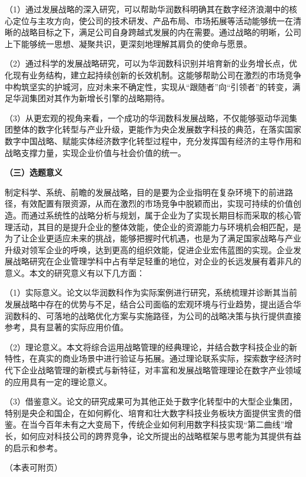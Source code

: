 \documentclass[UTF8, a4paper, 11pt]{ctexart}
\begin{document}
\begin{UnifiedBox}
（1）通过发展战略的深入研究，可以帮助华润数科明确其在数字经济浪潮中的核心定位与主攻方向，使公司的技术研发、产品布局、市场拓展等活动能够统一在清晰的战略目标之下，满足公司自身跨越式发展的内在需要。通过战略的明晰，公司上下能够统一思想、凝聚共识，更深刻地理解其肩负的使命与愿景。

（2）通过科学的发展战略研究，可以为华润数科识别并培育新的业务增长点，优化现有业务结构，建立起持续创新的长效机制。这能够帮助公司在激烈的市场竞争中构筑坚实的护城河，应对未来不确定性，实现从“跟随者”向“引领者”的转变，满足华润集团对其作为新增长引擎的战略期待。

（3）从更宏观的视角来看，一个成功的华润数科发展战略，不仅能够驱动华润集团整体的数字化转型与产业升级，更能作为央企发展数字科技的典范，在落实国家数字中国战略、赋能实体经济数字化转型过程中，充分发挥国有经济的主导作用和战略支撑力量，实现企业价值与社会价值的统一。

\vspace{0.4cm}
\noindent \textbf{（三）选题意义}

\vspace{0.2cm}
制定科学、系统、前瞻的发展战略，目的是要为企业指明在复杂环境下的前进路径，有效配置有限资源，从而在激烈的市场竞争中脱颖而出，实现可持续的价值创造。而通过系统性的战略分析与规划，属于企业为了实现长期目标而采取的核心管理活动，其目的是提升企业的整体效能，使企业的资源能力与环境机会相匹配，是为了让企业更适应未来的挑战，能够把握时代机遇，也是为了满足国家战略与产业升级对领军企业的呼唤，达到更高的组织效能，促进企业宏伟蓝图的实现。企业发展战略研究在企业管理学科中占有举足轻重的地位，对企业的长远发展有着非凡的意义。本文的研究意义有以下几方面：

（1）实际意义。论文以华润数科作为实际案例进行研究，系统梳理并诊断其当前发展战略中存在的优势与不足，结合公司面临的宏观环境与行业趋势，提出适合华润数科的、可落地的战略优化方案与实施路径，为公司的战略决策与执行提供直接参考，具有显著的实际应用价值。

（2）理论意义。本文将综合运用战略管理的经典理论，并结合数字科技企业的新特性，在真实的商业场景中进行验证与拓展。通过理论联系实际，探索数字经济时代下企业战略管理的新模式与新特征，对丰富和发展战略管理理论在数字产业领域的应用具有一定的理论意义。

（3）借鉴意义。论文的研究成果可为其他正处于数字化转型中的大型企业集团，特别是央企和国企，在如何孵化、培育和壮大数字科技业务板块方面提供宝贵的借鉴。在当今百年未有之大变局下，传统企业如何利用数字科技实现“第二曲线”增长，如何应对科技公司的跨界竞争，论文所提出的战略框架与思考能为其提供有益的启示和参考。

\vfill
\begin{flushright}
    （本表可附页）
\end{flushright}
\end{UnifiedBox}
\newpage
\end{document}
